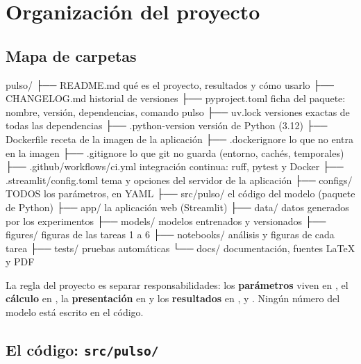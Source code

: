 \chapter{Organización del proyecto}

\section{Mapa de carpetas}
\begin{archivo}[label=estructura]
pulso/
├── README.md               qué es el proyecto, resultados y cómo usarlo
├── CHANGELOG.md            historial de versiones
├── pyproject.toml          ficha del paquete: nombre, versión, dependencias, comando pulso
├── uv.lock                 versiones exactas de todas las dependencias
├── .python-version         versión de Python (3.12)
├── Dockerfile              receta de la imagen de la aplicación
├── .dockerignore           lo que no entra en la imagen
├── .gitignore              lo que git no guarda (entorno, cachés, temporales)
├── .github/workflows/ci.yml   integración continua: ruff, pytest y Docker
├── .streamlit/config.toml  tema y opciones del servidor de la aplicación
├── configs/                TODOS los parámetros, en YAML
├── src/pulso/              el código del modelo (paquete de Python)
├── app/                    la aplicación web (Streamlit)
├── data/                   datos generados por los experimentos
├── models/                 modelos entrenados y versionados
├── figures/                figuras de las tareas 1 a 6
├── notebooks/              análisis y figuras de cada tarea
├── tests/                  pruebas automáticas
└── docs/                   documentación, fuentes LaTeX y PDF
\end{archivo}

La regla del proyecto es separar responsabilidades: los \textbf{parámetros} viven en
, el \textbf{cálculo} en , la \textbf{presentación} en
 y los \textbf{resultados} en ,  y
. Ningún número del modelo está escrito en el código.

\section{El código: \texttt{src/pulso/}}

